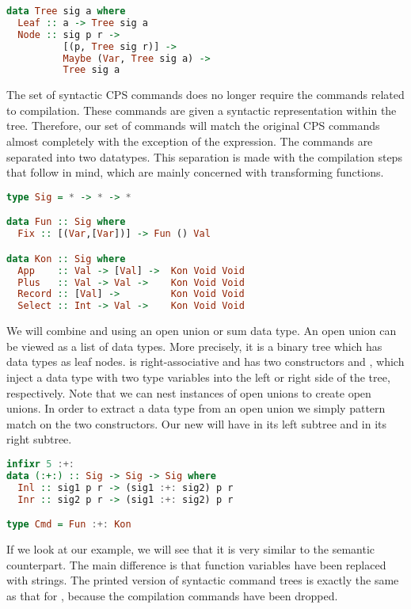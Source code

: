 \begin{lstlisting}[language=Haskell]
data Tree sig a where
  Leaf :: a -> Tree sig a
  Node :: sig p r ->
          [(p, Tree sig r)] ->
          Maybe (Var, Tree sig a) ->
          Tree sig a
\end{lstlisting}

The set of syntactic \ac{CPS} commands does no longer require the commands related to compilation. These commands are given a syntactic representation within the tree. Therefore, our set of commands will match the original \ac{CPS} commands almost completely with the exception of the  expression. The commands are separated into two datatypes. This separation is made with the compilation steps that follow in mind, which are mainly concerned with transforming functions.

\begin{lstlisting}[language=Haskell]
type Sig = * -> * -> *

data Fun :: Sig where
  Fix :: [(Var,[Var])] -> Fun () Val

data Kon :: Sig where
  App    :: Val -> [Val] ->  Kon Void Void
  Plus   :: Val -> Val ->    Kon Void Void
  Record :: [Val] ->         Kon Void Void
  Select :: Int -> Val ->    Kon Void Void
\end{lstlisting}

We will combine  and  using an open union or sum data type. An open union can be viewed as a list of data types. More precisely, it is a binary tree which has data types as leaf nodes. \icode{:+:} is right-associative and has two constructors  and , which inject a data type with two type variables into the left or right side of the tree, respectively. Note that we can nest instances of open unions to create open unions. In order to extract a data type from an open union we simply pattern match on the two constructors. Our new  will have  in its left subtree and  in its right subtree.

\begin{lstlisting}[language=Haskell]
infixr 5 :+:
data (:+:) :: Sig -> Sig -> Sig where
  Inl :: sig1 p r -> (sig1 :+: sig2) p r
  Inr :: sig2 p r -> (sig1 :+: sig2) p r

type Cmd = Fun :+: Kon
\end{lstlisting}

If we look at our example, we will see that it is very similar to the semantic counterpart. The main difference is that function variables have been replaced with strings. The printed version of syntactic command trees is exactly the same as that for , because the compilation commands have been dropped.

